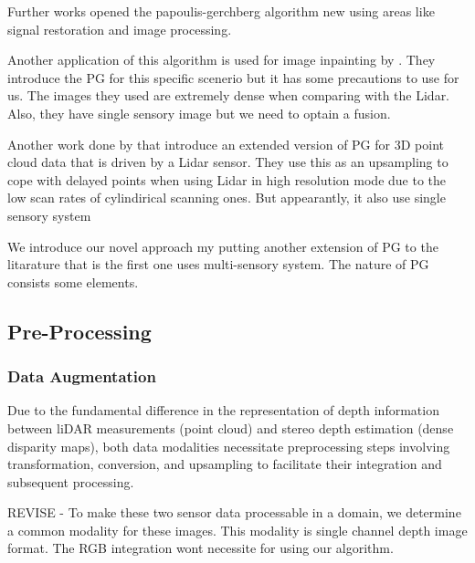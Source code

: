 \documentclass[conference]{IEEEtran}
\begin{document}
Further works opened the papoulis-gerchberg algorithm new using areas like signal restoration and image processing.

Another application of this algorithm is used for image inpainting by \cite{pg-image-inpaint-2009}. They introduce the PG for this specific scenerio but it has some precautions to use for us. The images they used are extremely dense when comparing with the Lidar. Also, they have single sensory image but we need to optain a fusion. 

Another work done by \cite{ozbay2015high} that introduce an extended version of PG for 3D point cloud data that is driven by a Lidar sensor. They use this as an upsampling to cope with delayed points when using Lidar in high resolution mode due to the low scan rates of cylindirical scanning ones. But appearantly, it also use single sensory system

We introduce our novel approach my putting another extension of PG to the litarature that is the first one uses multi-sensory system. The nature of PG consists some elements. 


\subsection{Pre-Processing}
\subsubsection{Data Augmentation}
Due to the fundamental difference in the representation of depth information between liDAR measurements (point cloud) and stereo depth estimation (dense disparity maps), both data modalities necessitate preprocessing steps involving transformation, conversion, and upsampling to facilitate their integration and subsequent processing.

REVISE - To make these two sensor data processable in a domain, we determine a common modality for these images. This modality is single channel depth image format. The RGB integration wont necessite for using our algorithm.
\end{document}
